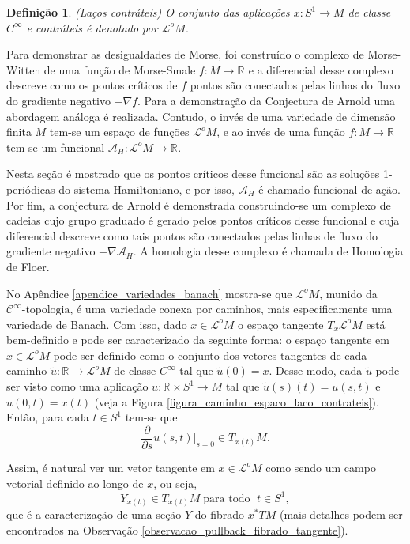 \documentclass[12pt]{book}
\newtheorem{definicao}[teorema]{Definição}
\newcommand{\circulo}{S^{1}}
\newcommand{\cktopologia}[1]{\mathcal{C}^{#1}\text{-topologia}}
\newcommand{\derivadaparcial}[2]{\frac{\partial #1}{\partial #2}}
\newcommand{\espacotangenteponto}[2]{T_{#1}#2}
\newcommand{\funcionalH}{\mathcal{A}_{H}}
\newcommand{\gradiente}{\nabla f}
\newcommand{\gradientefuncional}{\nabla \funcionalH}
\newcommand{\pullbackfibradotangente}[2]{#1^{*}T#2}
\newcommand{\pullbackfibradotangenteM}[1]{\pullbackfibradotangente{#1}{M}}
\newcommand{\retacartesianocirculo}{\real{} \times \circulo}
\newcommand{\real}[1]{\mathbb{R}^{#1}}
\newcommand{\reta}{\real{}}
\newcommand{\lacocontrateis}{\mathcal{L}^{o}M}
\begin{document}
	\begin{definicao}
		(Laços contráteis) O conjunto das aplicações $x:\circulo \to M$ de classe $C^{\infty}$ e contráteis é denotado por $\lacocontrateis$.
	\end{definicao}
	
	Para demonstrar as desigualdades de Morse, foi construído o complexo de Morse-Witten de uma função de Morse-Smale $f: M\to \reta$ e a diferencial desse complexo descreve como os pontos críticos de $f$ pontos são conectados pelas linhas do fluxo do gradiente negativo $-\gradiente$. Para a demonstração da Conjectura de Arnold uma abordagem análoga é realizada. Contudo, o invés de uma variedade de dimensão finita $M$ tem-se um espaço de funções $\lacocontrateis$, e ao invés de uma função $f:M\to \reta$ tem-se um funcional $\funcionalH:\lacocontrateis\to \reta$.
	
	Nesta seção é mostrado que os pontos críticos desse funcional são as soluções 1-periódicas do sistema Hamiltoniano, e por isso, $\funcionalH$ é chamado funcional de ação. Por fim, a conjectura de Arnold é demonstrada construindo-se um complexo de cadeias cujo grupo graduado é gerado pelos pontos críticos desse funcional e cuja diferencial descreve como tais pontos são conectados pelas linhas de fluxo do gradiente negativo $-\gradientefuncional$. A homologia desse complexo é chamada de Homologia de Floer.
	
	No Apêndice \ref{apendice_variedades_banach} mostra-se que $\lacocontrateis$, munido da $\cktopologia{\infty}$, é uma variedade conexa por caminhos, mais especificamente uma variedade de Banach. Com isso, dado $x\in \lacocontrateis$ o espaço tangente $\espacotangenteponto{x}{\lacocontrateis}$ está bem-definido e pode ser caracterizado da seguinte forma: o espaço tangente em $x \in \lacocontrateis$ pode ser definido como o conjunto dos vetores tangentes de cada caminho $\tilde{u}:\reta\to \lacocontrateis$ de classe $C^{\infty}$ tal que $\tilde{u}(0)=x$. Desse modo, cada $\tilde{u}$ pode ser visto como uma aplicação $u: \retacartesianocirculo \to M$ tal que $\tilde{u}(s)(t) = u(s,t)$ e $u(0,t) = x(t)$ (veja a Figura \ref{figura_caminho_espaco_laco_contrateis}). Então, para cada $t\in \circulo$ tem-se que
	$$
	\derivadaparcial{}{s}u(s,t)|_{s=0} \in \espacotangenteponto{x(t)}{M}.
	$$
	
	Assim, é natural ver um vetor tangente em $x\in \lacocontrateis$ como sendo um campo vetorial definido ao longo de $x$, ou seja, 
	$$
	Y_{x(t)}\in \espacotangenteponto{x(t)}{M} \;\text{para todo  }\; t\in \circulo,
	$$
	que é a caracterização de uma seção $Y$ do fibrado $\pullbackfibradotangenteM{x}$ (mais detalhes podem ser encontrados na Observação \ref{observacao_pullback_fibrado_tangente}). 
	
\end{document}
